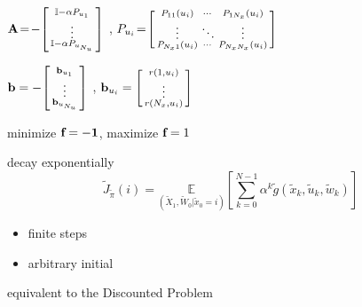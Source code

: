 \documentclass[landscape,a0paper,fontscale=0.285]{baposter} %
\renewenvironment{bmatrix}{\left[\begin{smallmatrix}}{\end{smallmatrix}\right]}
\begin{document}
\begin{poster}
{\begin{itemize}
            \hspace{-10pt}$\mathbf{A}\!=\!-\begin{bmatrix}
            \mathbb{I} - \alpha P_{u_1} \\
            \vdots \\
            \mathbb{I} - \alpha P_{u_{N_u}}
            \end{bmatrix}$ , $P_{u_i}\!=\!\begin{bmatrix}
            P_{11}(u_i) & \cdots & P_{1N_x}(u_i) \\
            \vdots & \ddots & \vdots \\
            P_{N_x1}(u_i) & \cdots & P_{N_xN_x}(u_i)
            \end{bmatrix}$
            
            \hspace{-10pt}$\mathbf{b} = -\begin{bmatrix}
            \mathbf{b}_{u_1} \\
            \vdots \\
            \mathbf{b}_{u_{N_u}}
            \end{bmatrix}$ , $\mathbf{b}_{u_i} = \begin{bmatrix}
            r(1,u_i) \\
            \vdots \\
            r(N_x,u_i)
            \end{bmatrix}$
        
\end{itemize}

minimize  $\textbf f = -\textbf  1$, maximize  $\textbf f=1$


\colorbox[HTML]{CCFFFF}{}
 decay exponentially
\[
\tilde{J}_{\tilde{\pi}}(i) = \underset{(\tilde{X}_1,\tilde{W}_0|\tilde{x}_0=i)}{\mathbb{E}}\left[\sum_{k=0}^{N-1}\alpha^k\tilde{g}(\tilde{x}_k,\tilde{u}_k,\tilde{w}_k)\right]
\]

\begin{itemize}
  \item finite steps
  \item arbitrary initial
\end{itemize}


\colorbox[HTML]{CCFFFF}{}
equivalent to the Discounted Problem

}
\end{poster}
\end{document}

